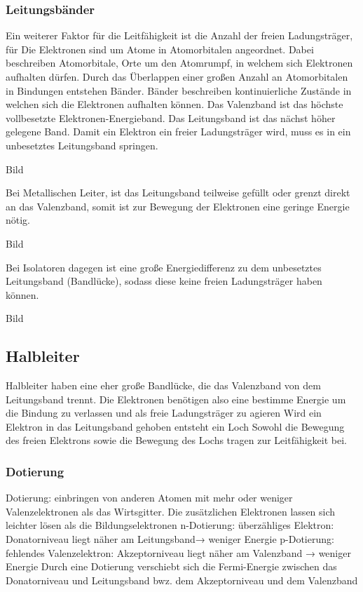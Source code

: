\documentclass[a4paper]{scrartcl}
\numberwithin{equation}{subsection}
\begin{document}
\subsubsection{Leitungsbänder}
Ein weiterer Faktor für die Leitfähigkeit ist die Anzahl der freien Ladungsträger, für 
Die Elektronen sind um Atome in Atomorbitalen angeordnet. Dabei beschreiben Atomorbitale, Orte um den Atomrumpf, in welchem sich Elektronen aufhalten dürfen. Durch das Überlappen einer großen Anzahl an Atomorbitalen in Bindungen entstehen Bänder.
Bänder beschreiben kontinuierliche Zustände in welchen sich die Elektronen aufhalten können.
Das Valenzband ist das höchste vollbesetzte Elektronen-Energieband. Das Leitungsband ist das nächst höher gelegene Band.
Damit ein Elektron ein freier Ladungsträger wird, muss es in ein unbesetztes Leitungsband springen. 

Bild

Bei Metallischen Leiter, ist das Leitungsband teilweise gefüllt oder grenzt direkt an das Valenzband, somit ist zur Bewegung der Elektronen eine geringe Energie nötig.

Bild

Bei Isolatoren dagegen ist eine große Energiedifferenz zu dem unbesetztes Leitungsband (Bandlücke), sodass diese keine freien Ladungsträger haben können.

Bild

\subsection{Halbleiter}
Halbleiter haben eine eher große Bandlücke, die das Valenzband von dem Leitungsband trennt.
Die Elektronen benötigen also eine bestimme Energie um die Bindung zu verlassen und als freie Ladungsträger zu agieren
Wird ein Elektron in das Leitungsband gehoben entsteht ein Loch
Sowohl die Bewegung des freien Elektrons sowie die Bewegung des Lochs tragen zur Leitfähigkeit bei.

\subsubsection{Dotierung}
Dotierung: einbringen von anderen Atomen mit mehr oder weniger Valenzelektronen als das Wirtsgitter.
Die zusätzlichen Elektronen lassen sich leichter lösen als die Bildungselektronen
n-Dotierung: überzähliges Elektron: Donatorniveau liegt näher am Leitungsband→ weniger Energie
p-Dotierung: fehlendes Valenzelektron: Akzeptorniveau liegt näher am Valenzband → weniger Energie
Durch eine Dotierung verschiebt sich die Fermi-Energie zwischen das Donatorniveau und Leitungsband bwz. dem Akzeptorniveau und dem Valenzband
\end{document}
